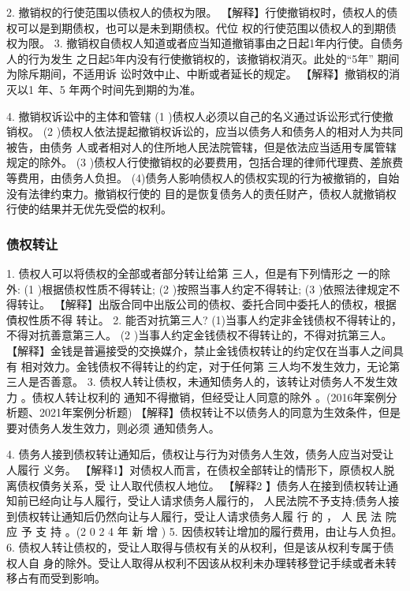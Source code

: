 \documentclass[UTF8,12pt]{ctexart}
\numberwithin{equation}{section} %
\numberwithin{figure}{section}
\numberwithin{table}{section}
\begin{document}
	2. 撤销权的行使范围以债权人的债权为限。 【解释】行使撤销权时，债权人的债权可以是到期债权，也可以是未到期债权。代位 权的行使范围以债权人的到期债权为限。
	3. 撤销权自债权人知道或者应当知道撤销事由之日起1年内行使。自债务人的行为发生 之日起5年内没有行使撤销权的，该撤销权消灭。此处的“5年” 期间为除斥期间，不适用诉 讼时效中止、中断或者延长的规定。
	【解释】撤销权的消灭以1 年、5 年两个时间先到期的为准。
	
	4. 撤销权诉讼中的主体和管辖
	(1 )债权人必须以自己的名义通过诉讼形式行使撤销权。
	(2 )债权人依法提起撤销权诉讼的，应当以债务人和债务人的相对人为共同被告，由债务 人或者相对人的住所地人民法院管辖，但是依法应当适用专属管辖规定的除外。
	(3 )债权人行使撤销权的必要费用，包括合理的律师代理费、差旅费等费用，由债务人负担。 (4)债务人影响债权人的债权实现的行为被撤销的，自始没有法律约束力。撤销权行使的 目的是恢复债务人的责任财产，债权人就撤销权行使的结果并无优先受偿的权利。
	
	
	\subsubsection{债权转让}
	1. 债权人可以将债权的全部或者部分转让给第 三人，但是有下列情形之 一的除外: (1 )根据债权性质不得转让;
	(2 )按照当事人约定不得转让;
	(3 )依照法律规定不得转让。
	【解释】出版合同中出版公司的债权、委托合同中委托人的债权，根据債权性质不得 转让。
	2. 能否对抗第三人?
	(1)当事人约定非金钱债权不得转让的，不得对抗善意第三人。
	(2 )当事人约定金钱债权不得转让的，不得对抗第三人。 【解释】金钱是普遍接受的交换媒介，禁止金钱债权转让的约定仅在当事人之间具有 相对效力。金钱债权不得转让的约定，对于任何第 三人均不发生效力，无论第三人是否善意。 
	3. 债权人转让债权，未通知债务人的，该转让对债务人不发生效力 。债权人转让权利的 通知不得撤销，但经受让人同意的除外 。(2016年案例分析题、2021年案例分析题) 【解释】债权转让不以债务人的同意为生效条件，但是要对债务人发生效力，则必须 通知债务人。
	
	4. 债务人接到债权转让通知后，债权让与行为对债务人生效，债务人应当对受让人履行 义务。
	【解释1】对债权人而言，在债权全部转让的情形下，原债权人脱离债权債务关系，受 让人取代债权人地位。
	【解释2 】债务人在接到债权转让通知前已经向让与人履行，受让人请求债务人履行的， 人民法院不予支持;债务人接到债权转让通知后仍然向让与人履行，受让人请求债务人履 行 的 ， 人 民 法 院 应 予 支 持 。(2 0 2 4 年 新 增 )
	5. 因债权转让增加的履行费用，由让与人负担。
	6. 债权人转让债权的，受让人取得与债权有关的从权利，但是该从权利专属于债权人自 身的除外。受让人取得从权利不因该从权利未办理转移登记手续或者未转移占有而受到影响。
	
\end{document}
